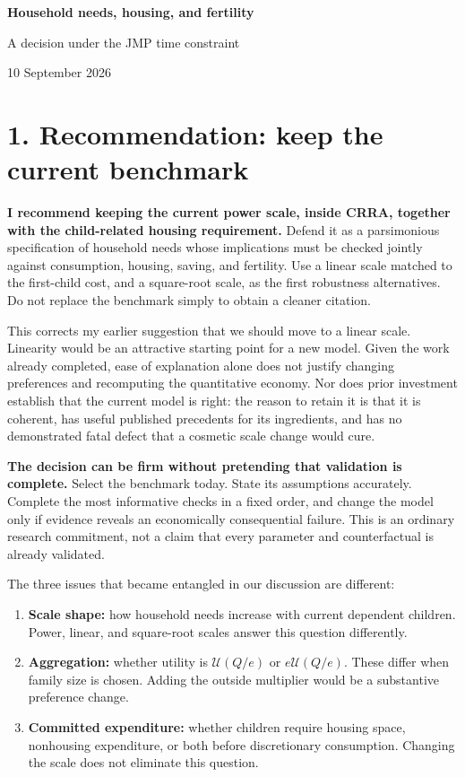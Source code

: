 \documentclass[11pt,letterpaper]{article}
\newcommand{\U}{\mathcal U}
\begin{document}
\thispagestyle{empty}
{\LARGE\bfseries Household needs, housing, and fertility}\par
{\large A decision under the JMP time constraint}\par
10 September 2026

\section*{1. Recommendation: keep the current benchmark}
\textbf{I recommend keeping the current power scale, inside CRRA, together with the child-related housing requirement.} Defend it as a parsimonious specification of household needs whose implications must be checked jointly against consumption, housing, saving, and fertility. Use a linear scale matched to the first-child cost, and a square-root scale, as the first robustness alternatives. Do not replace the benchmark simply to obtain a cleaner citation.

This corrects my earlier suggestion that we should move to a linear scale. Linearity would be an attractive starting point for a new model. Given the work already completed, ease of explanation alone does not justify changing preferences and recomputing the quantitative economy. Nor does prior investment establish that the current model is right: the reason to retain it is that it is coherent, has useful published precedents for its ingredients, and has no demonstrated fatal defect that a cosmetic scale change would cure.

\textbf{The decision can be firm without pretending that validation is complete.} Select the benchmark today. State its assumptions accurately. Complete the most informative checks in a fixed order, and change the model only if evidence reveals an economically consequential failure. This is an ordinary research commitment, not a claim that every parameter and counterfactual is already validated.

The three issues that became entangled in our discussion are different:
\begin{enumerate}
\item \textbf{Scale shape:} how household needs increase with current dependent children. Power, linear, and square-root scales answer this question differently.
\item \textbf{Aggregation:} whether utility is $\U(Q/e)$ or $e\U(Q/e)$. These differ when family size is chosen. Adding the outside multiplier would be a substantive preference change.
\item \textbf{Committed expenditure:} whether children require housing space, nonhousing expenditure, or both before discretionary consumption. Changing the scale does not eliminate this question.
\end{enumerate}
\end{document}
